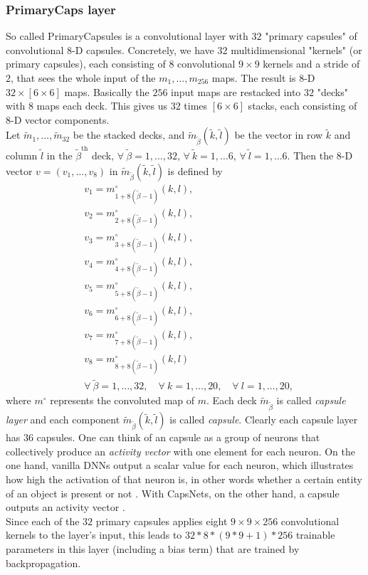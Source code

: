 \documentclass{article}
\begin{document}
{\subsubsection{PrimaryCaps layer}
So called PrimaryCapsules \cite{hinton17} is a convolutional layer with $32$ "primary capsules" of convolutional $8$-D capsules. Concretely, we have 32 multidimensional "kernels" (or primary capsules), each consisting of $8$ convolutional $9\times9$ kernels and a stride of $2$, that sees the whole input of the $m_1, \ldots, m_{256}$ maps. The result is $8$-D $32 \times [6 \times 6]$ maps. Basically the $256$ input maps are restacked into $32$ "decks" with $8$ maps each deck. This gives us $32$ times $[6 \times 6]$ stacks, each consisting of $8$-D vector components.\\
Let $\tilde{m}_1, \ldots , \tilde{m}_{32}$ be the stacked decks, and $\tilde{m}_{\tilde{\beta}}(\tilde{k},\tilde{l})$ be the vector in row $\tilde{k}$ and column $\tilde{l}$ in the $\tilde{\beta}^{\text{th}}$ deck, $\forall \ \tilde{\beta}=1, \ldots, 32$, $\forall \ \tilde{k}=1, \ldots 6$, $\forall \ \tilde{l}=1, \ldots 6$. Then the $8$-D vector $v=(v_1, \ldots , v_8)$ in $\tilde{m}_{\tilde{\beta}}(\tilde{k},\tilde{l})$ is defined by
\begin{align*}
&v_1=m^\circ_{1+8(\tilde{\beta}-1)}(k,l),\\
&v_2=m^\circ_{2+8(\tilde{\beta}-1)}(k,l),\\
&v_3=m^\circ_{3+8(\tilde{\beta}-1)}(k,l),\\
&v_4=m^\circ_{4+8(\tilde{\beta}-1)}(k,l),\\
&v_5=m^\circ_{5+8(\tilde{\beta}-1)}(k,l),\\
&v_6=m^\circ_{6+8(\tilde{\beta}-1)}(k,l),\\
&v_7=m^\circ_{7+8(\tilde{\beta}-1)}(k,l),\\
&v_8=m^\circ_{8+8(\tilde{\beta}-1)}(k,l)\\
&\forall \ \tilde{\beta}=1, \ldots, 32, \quad \forall \ k=1, \ldots, 20, \quad \forall \ l=1, \ldots, 20,
\end{align*} 
where $m^\circ$ represents the convoluted map of $m$.
Each deck $\tilde{m}_{\tilde{\beta}}$ is called \textit{capsule layer} and each component $\tilde{m}_{\tilde{\beta}}(\tilde{k},\tilde{l})$ is called \textit{capsule}. Clearly each capsule layer has 36 capsules. One can think of an capsule as a group of neurons that collectively produce an \textit{activity vector} with one element for each neuron. On the one hand, vanilla DNNs output a scalar value for each neuron, which illustrates how high the activation of that neuron is, in other words whether a certain entity of an object is present or not \cite{wiki_convnets}. With CapsNets, on the other hand, a capsule outputs an activity vector \cite{hinton17}.\\
Since each of the $32$ primary capsules applies eight $9 \times 9 \times 256$ convolutional kernels to the layer's input, this leads to $32*8*(9*9+1)*256$ trainable parameters in this layer (including a bias term) \cite{medium:capsnet} that are trained by backpropagation.

}
\end{document}
